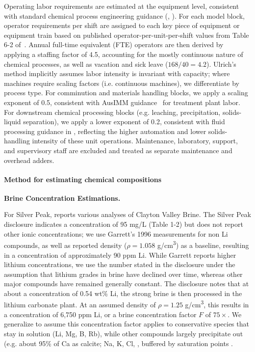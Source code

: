 Operating labor requirements are estimated at the equipment level, consistent with standard chemical process engineering guidance (\citet{ulrichGuideChemicalEngineering1984}, \citet{turtonAnalysisSynthesisDesign2009}). For each model block, operator requirements per shift are assigned to each key piece of equipment or equipment train based on published operator-per-unit-per-shift values from Table 6-2 of~\citet{ulrichGuideChemicalEngineering1984}. Annual full-time equivalent (FTE) operators are then derived by applying a staffing factor of 4.5, accounting for the mostly continuous nature of chemical processes, as well as vacation and sick leave ($168 / 40 = 4.2$). Ulrich's method implicitly assumes labor intensity is invariant with capacity; where machines require scaling factors (i.e. continuous machines), we differentiate by process type. For comminution and materials handling blocks, we apply a scaling exponent of 0.5, consistent with AusIMM guidance~\cite{ausimmMonograph27Cost} for treatment plant labor. For downstream chemical processing blocks (e.g. leaching, precipitation, solids-liquid separation), we apply a lower exponent of 0.2, consistent with fluid processing guidance in \citet{petersPlantDesignEconomics1991}, reflecting the higher automation and lower solids-handling intensity of these unit operations. Maintenance, laboratory, support, and supervisory staff are excluded and treated as separate maintenance and overhead adders. 

\paragraph{Method for estimating chemical compositions}\label{app:04-methods-modelblocks-oreconc}

\medskip
\noindent\textbf{Brine Concentration Estimations.}\quad

For Silver Peak, \citet{garrettHandbookLithiumNatural2004} reports various analyses of Clayton Valley Brine. The Silver Peak disclosure indicates a concentration of 95 mg/L (Table 1-2)\cite{srkconsultingSECTechnicalReport2023a} but does not report other ionic concentrations; we use Garrett's 1996 measurements for non Li compounds, as well as reported density ($\rho=1.058$ g/cm\textsuperscript{3}) as a baseline, resulting in a concentration of approximately 90 ppm Li. While Garrett reports higher lithium concentrations, we use the number stated in the disclosure under the assumption that lithium grades in brine have declined over time, whereas other major compounds have remained generally constant. The disclosure notes that at about a concentration of 0.54 wt\% Li, the strong brine is then processed in the lithium carbonate plant. At an assumed density of $\rho=1.25$ g/cm\textsuperscript{3}, this results in a concentration of 6,750 ppm Li, or a brine concentration factor $F$ of $75 \times$. We generalize to assume this concentration factor applies to conservative species that stay in solution (Li, Mg, B, Rb), while other compounds largely precipitate out (e.g. about 95\% of Ca as calcite; Na, K, Cl, ,  buffered by saturation points \cite{flexerLithiumRecoveryBrines2018, heEnvironmentalLifeCycle2025}. 

